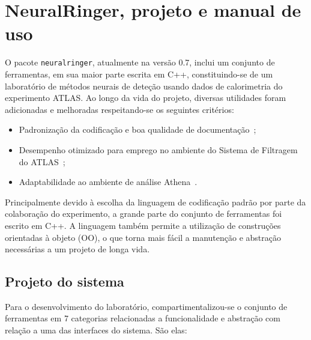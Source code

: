 \typeout{ ====================================================================}
\typeout{ ====================================================================}

\chapter{NeuralRinger, projeto e manual de uso}

O pacote \texttt{neuralringer}, atualmente na versão 0.7, inclui um conjunto de
ferramentas, em sua maior parte escrita em C++, constituindo-se de um
laboratório de métodos neurais de deteção usando dados de calorimetria do
experimento ATLAS. Ao longo da vida do projeto, diversas utilidades foram
adicionadas e melhoradas respeitando-se os seguintes critérios:

\begin{itemize}
\item Padronização da codificação e boa qualidade de
documentação~\cite{cpp-codingstd};
\item Desempenho otimizado para emprego no ambiente do Sistema de Filtragem do
ATLAS~\cite{hlt-tdr};
\item Adaptabilidade ao ambiente de análise Athena~\cite{atlas-workbook}.
\end{itemize}

Principalmente devido à escolha da linguagem de codificação padrão por parte da
colaboração do experimento, a grande parte do conjunto de ferramentas foi
escrito em C++. A linguagem também permite a utilização de construções
orientadas à objeto (OO), o que torna mais fácil a manutenção e abstração
necessárias a um projeto de longa vida.

\section{Projeto do sistema}

Para o desenvolvimento do laboratório, compartimentalizou-se o conjunto de
ferramentas em 7 categorias relacionadas a funcionalidade e abstração com
relação a uma das interfaces do sistema. São elas:

